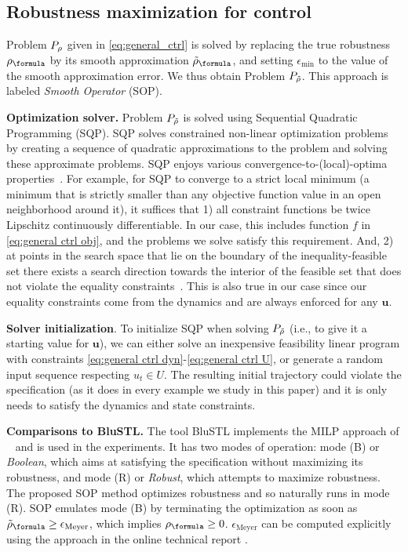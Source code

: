 \subsection{Robustness maximization for control}
\label{sec:toy example}
Problem $P_\rho$ given in \eqref{eq:general_ctrl} is solved by replacing the true robustness $\robf$ by its smooth approximation $\srobf$, and setting $\epsilon_{\text{min}}$ to the value of the smooth approximation error.
We thus obtain Problem $P_{\tilde{\rho}}$. 
This approach is labeled \textit{Smooth Operator} (SOP).

\textbf{Optimization solver.}
Problem $P_{\tilde{\rho}}$ is solved using Sequential Quadratic Programming (SQP).
SQP solves constrained non-linear optimization problems by creating a sequence of quadratic approximations to the problem and solving these approximate problems.
SQP enjoys various convergence-to-(local)-optima properties~\cite[Section 2.9]{Polak97_Optim}.
For example, for SQP to converge to a strict local minimum (a minimum that is strictly smaller than any objective function value in an open neighborhood around it), it suffices that 
1) all constraint functions be twice Lipschitz continuously differentiable. 
In our case, this includes function $f$ in \eqref{eq:general ctrl obj}, and the problems we solve satisfy this requirement.
And, 
2) at points in the search space that lie on the boundary of the inequality-feasible set
there exists a search direction towards the interior of the feasible set that does not violate the equality constraints~\cite[Assumption 2.9.1]{Polak97_Optim}. 
This is also true in our case since our equality constraints come from the dynamics and are always enforced for any $\mathbf{u}$.

\textbf{Solver initialization}.
To initialize SQP when solving $P_{\tilde{\rho}}$ (i.e., to give it a starting value for $\mathbf{u}$), we can either solve an inexpensive feasibility linear program with constraints \eqref{eq:general ctrl dyn}-\eqref{eq:general ctrl U}, 
or generate a random input sequence respecting $u_t \in U$. 
The resulting initial trajectory could violate the specification (as it does in every example we study in this paper) and it is only needs to satisfy the dynamics and state constraints.

\textbf{Comparisons to BluSTL.}
The tool BluSTL implements the MILP approach of ~\cite{Raman14_MPCSTL} and is used in the experiments.
It has two modes of operation: mode (B) or \textit{Boolean}, which aims at satisfying the specification without maximizing its robustness, and mode (R) or \textit{Robust}, which attempts to maximize robustness. 
The proposed SOP method optimizes robustness and so naturally runs in mode (R).
SOP emulates mode (B) by terminating the optimization as soon as $\srobf \geq \epsilon_{\text{Meyer}}$, which implies $\rob_{\formula} \geq 0$. $\epsilon_{\text{Meyer}}$ can be computed explicitly using the approach in the online technical report \cite{PantAM17_SmoothOpTechRpt}.



%
